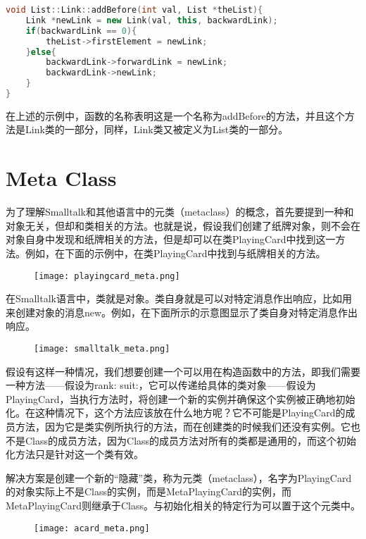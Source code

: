 \begin{lstlisting}[language=C++]
void List::Link::addBefore(int val, List *theList){
	Link *newLink = new Link(val, this, backwardLink);
	if(backwardLink == 0){
		theList->firstElement = newLink;
	}else{
		backwardLink->forwardLink = newLink;
		backwardLink->newLink;
	}
}
\end{lstlisting}

在上述的示例中，函数的名称表明这是一个名称为addBefore的方法，并且这个方法是Link类的一部分，同样，Link类又被定义为List类的一部分。

\section{Meta Class}


为了理解Smalltalk和其他语言中的元类（metaclass）的概念，首先要提到一种和对象无关，但却和类相关的方法。也就是说，假设我们创建了纸牌对象，则不会在对象自身中发现和纸牌相关的方法，但是却可以在类PlayingCard中找到这一方法。例如，在下面的示例中，在类PlayingCard中找到与纸牌相关的方法。

\begin{figure}[htbp]
\centering
\texttt{[image: playingcard\_meta.png]}
\label{fig:playingcard_meta}
\end{figure}


在Smalltalk语言中，类就是对象。类自身就是可以对特定消息作出响应，比如用来创建对象的消息new。例如，在下面所示的示意图显示了类自身对特定消息作出响应。


\begin{figure}[htbp]
\centering
\texttt{[image: smalltalk\_meta.png]}
\label{fig:smalltalk_meta}
\end{figure}

假设有这样一种情况，我们想要创建一个可以用在构造函数中的方法，即我们需要一种方法——假设为rank: suit:，它可以传递给具体的类对象——假设为PlayingCard，当执行方法时，将创建一个新的实例并确保这个实例被正确地初始化。在这种情况下，这个方法应该放在什么地方呢？它不可能是PlayingCard的成员方法，因为它是类实例所执行的方法，而在创建类的时候我们还没有实例。它也不是Class的成员方法，因为Class的成员方法对所有的类都是通用的，而这个初始化方法只是针对这一个类有效。

解决方案是创建一个新的“隐藏”类，称为元类（metaclass），名字为PlayingCard的对象实际上不是Class的实例，而是MetaPlayingCard的实例，而MetaPlayingCard则继承于Class。与初始化相关的特定行为可以置于这个元类中。


\begin{figure}[htbp]
\centering
\texttt{[image: acard\_meta.png]}
\label{fig:acard_meta}
\end{figure}

